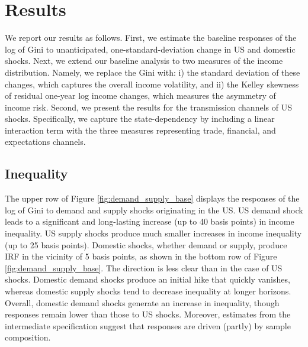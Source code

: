 \documentclass[12pt, a4paper]{article}
\begin{document}
\section{Results}
We report our results as follows. First, we estimate the baseline responses of the log of Gini to unanticipated, one-standard-deviation change in US and domestic shocks. Next, we extend our baseline analysis to two measures of the income distribution. Namely, we replace the Gini with: i) the standard deviation of these changes, which captures the overall income volatility, and ii) the Kelley skewness of residual one-year log income changes, which measures the asymmetry of income risk. Second, we present the results for the transmission channels of US shocks. Specifically, we capture the state-dependency by including a linear interaction term with the three measures representing trade, financial, and expectations channels.


\subsection{Inequality}
The upper row of Figure \ref{fig:demand_supply_base} displays the responses of the log of Gini to demand and supply shocks originating in the US. US demand shock leads to a significant and long-lasting increase (up to 40 basis points) in income inequality. US supply shocks produce much smaller increases in income inequality (up to 25 basis points). Domestic shocks, whether demand or supply, produce IRF in the vicinity of 5 basis points, as shown in the bottom row of Figure  \ref{fig:demand_supply_base}. The direction is less clear than in the case of US shocks. Domestic demand shocks produce an initial hike that quickly vanishes, whereas domestic supply shocks tend to decrease inequality at longer horizons. Overall, domestic demand shocks generate an increase in inequality, though responses remain lower than those to US shocks. Moreover, estimates from the intermediate specification suggest that responses are driven (partly) by sample composition. 

\end{document}
